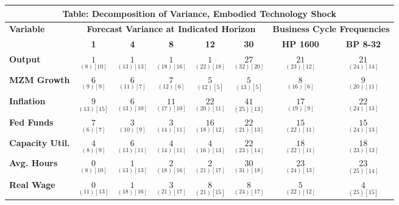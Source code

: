\documentclass{article}
\begin{document}
 
 \begin{tabular}{|l|c|@{}c|c|@{}c|c|@{}c|c|} 
 \hline 
 \multicolumn{8}{|c|}{\textbf{Table: Decomposition of Variance, Embodied Technology Shock}} \\ \hline 
 \textbf{Variable} & \multicolumn{5}{|c}{\textbf{Forecast Variance at 
 Indicated Horizon}} & \multicolumn{2}{|c|}{\textbf{Business Cycle 
 Frequencies}} \\ \cline{2-8} 
 & \textbf{1} & \textbf{4} & \textbf{8} & \textbf{12} & \textbf{30} & \textbf{%
 HP 1600} & \textbf{BP 8-32} \\ \hline\hline 
 \textbf{Output} & $\underset{(  8) [ 10]}{  1}$ & $\underset{( 13) [ 13]}{  1}$ & $\underset{( 18) [ 16]}{  1}$ & $\underset{( 22) [ 18]}{  1}$ & $\underset{( 32) [ 20]}{ 27}$ & $\underset{( 23) [ 12]}{ 21}$ & $\underset{( 24) [ 14]}{ 21}$ \\ \hline 
 \textbf{MZM Growth} & $\underset{(  9) [  9]}{  6}$ & $\underset{( 11) [  7]}{  6}$ & $\underset{( 12) [  6]}{  7}$ & $\underset{( 12) [  5]}{  5}$ & $\underset{( 13) [  5]}{  5}$ & $\underset{( 16) [  6]}{  8}$ & $\underset{( 20) [ 11]}{  9}$ \\ \hline 
 \textbf{Inflation} & $\underset{( 13) [ 15]}{  9}$ & $\underset{( 13) [ 10]}{  6}$ & $\underset{( 17) [ 10]}{ 11}$ & $\underset{( 20) [ 11]}{ 22}$ & $\underset{( 25) [ 13]}{ 41}$ & $\underset{( 19) [  9]}{ 17}$ & $\underset{( 24) [ 13]}{ 22}$ \\ \hline 
 \textbf{Fed Funds} & $\underset{(  6) [  7]}{  7}$ & $\underset{( 10) [  9]}{  3}$ & $\underset{( 14) [ 11]}{  3}$ & $\underset{( 18) [ 12]}{ 16}$ & $\underset{( 21) [ 13]}{ 22}$ & $\underset{( 22) [ 11]}{ 15}$ & $\underset{( 24) [ 13]}{ 15}$ \\ \hline 
 \textbf{Capacity Util.} & $\underset{(  8) [  9]}{  4}$ & $\underset{( 13) [ 11]}{  6}$ & $\underset{( 14) [ 11]}{  4}$ & $\underset{( 16) [ 13]}{  4}$ & $\underset{( 23) [ 14]}{ 22}$ & $\underset{( 22) [ 11]}{ 18}$ & $\underset{( 23) [ 13]}{ 18}$ \\ \hline 
 \textbf{Avg. Hours} & $\underset{(  8) [ 10]}{  0}$ & $\underset{( 13) [ 13]}{  1}$ & $\underset{( 18) [ 16]}{  2}$ & $\underset{( 21) [ 17]}{  2}$ & $\underset{( 31) [ 18]}{ 30}$ & $\underset{( 24) [ 13]}{ 23}$ & $\underset{( 25) [ 14]}{ 23}$ \\ \hline 
 \textbf{Real Wage} &  $\underset{( 11) [ 13]}{  0}$ & $\underset{( 18) [ 16]}{  1}$ & $\underset{( 21) [ 17]}{  3}$ & $\underset{( 21) [ 15]}{  8}$ & $\underset{( 24) [ 17]}{  8}$ & $\underset{( 22) [ 12]}{  5}$ & $\underset{( 25) [ 15]}{  4}$ \\ \hline 

\end{tabular}
\end{document}

